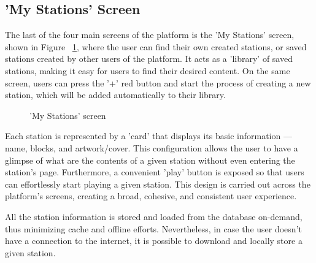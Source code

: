 \newpage
\subsection{'My Stations' Screen}

The last of the four main screens of the platform is the 'My Stations' screen, shown in Figure ~\ref{fig:mys}, where the user can find their own created stations, or saved stations created by other users of the platform. It acts as a 'library' of saved stations, making it easy for users to find their desired content. On the same screen, users can press the '+' red button and start the process of creating a new station, which will be added automatically to their library.

\begin{figure}[h]
\centering
{}
\caption{'My Stations' screen}
\label{fig:mys}
\end{figure}

Each station is represented by a 'card' that displays its basic information — name, blocks, and artwork/cover. This configuration allows the user to have a glimpse of what are the contents of a given station without even entering the station's page. Furthermore, a convenient 'play' button is exposed so that users can effortlessly start playing a given station. This design is carried out across the platform's screens, creating a broad, cohesive, and consistent user experience.

All the station information is stored and loaded from the database on-demand, thus minimizing cache and offline efforts. Nevertheless, in case the user doesn't have a connection to the internet, it is possible to download and locally store a given station.


